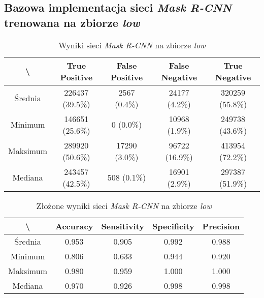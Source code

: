 \subsection{Bazowa implementacja sieci \textit{Mask R-CNN} trenowana na zbiorze \textit{low}}
\lowprocent

\begin{table}[H]
  \centering
	\caption{Wyniki sieci \textit{Mask R-CNN} na zbiorze \textit{low}}
	\vspace{6pt}
	{\footnotesize
		\begin{tabular}{|c|c|c|c|c|}
      \hline \textbackslash & True Positive & False Positive & False Negative & True Negative \\
      \hline Średnia & 226437 (39.5\%) & 2567 (0.4\%) & 24177 (4.2\%) & 320259 (55.8\%) \\
      \hline Minimum & 146651 (25.6\%) & 0 (0.0\%) & 10968 (1.9\%) & 249738 (43.6\%) \\
      \hline Maksimum & 289920 (50.6\%) & 17290 (3.0\%) & 96722 (16.9\%) & 413954 (72.2\%) \\
      \hline Mediana & 243457 (42.5\%) & 508 (0.1\%) & 16901 (2.9\%) & 297387 (51.9\%) \\
      \hline
		\end{tabular}
	}
  \vspace{0pt}
  \label{Tab:low_original}
\end{table}


\begin{table}[H]
	\centering
	\caption{Złożone wyniki sieci \textit{Mask R-CNN} na zbiorze \textit{low}}
	\vspace{6pt}
	{\footnotesize
		\begin{tabular}{|c|c|c|c|c|}
      \hline \textbackslash & Accuracy & Sensitivity & Specificity & Precision \\
      \hline Średnia & 0.953 & 0.905 & 0.992 & 0.988 \\
      \hline Minimum & 0.806 & 0.633 & 0.944 & 0.920 \\
      \hline Maksimum & 0.980 & 0.959 & 1.000 & 1.000 \\
      \hline Mediana & 0.970 & 0.926 & 0.998 & 0.998 \\
      \hline
		\end{tabular}
	}
  \vspace{0pt}
  \label{Tab:low_original_calculated}
\end{table}


